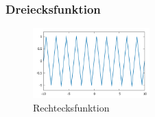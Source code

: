                     \subsubsection*{Dreiecksfunktion}
            \begin{figure}
                \vspace{10pt}
                \centering
                \includegraphics[width=0.4\textwidth]{Abb/dreieck.pdf}
                \caption{Rechtecksfunktion}
                \label{dreieck}
                \vspace{10pt}
            \end{figure}

